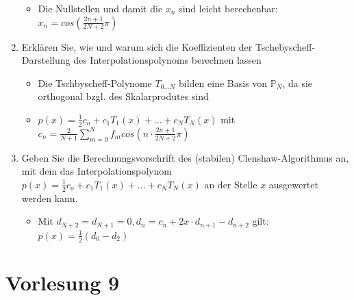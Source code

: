 \documentclass[]{article}
\newcommand*{\poly}{\ensuremath{\mathbb{P}}}
\begin{document}
\begin{enumerate}
\begin{itemize}
				\item Die Nullstellen und damit die $x_n$ sind leicht berechenbar: $x_n = cos(\frac{2n+1}{2N+2} \pi)$
			\end{itemize}
		\item Erklären Sie, wie und warum sich die Koeffizienten der Tschebyscheff-Darstellung des Interpolationspolynoms berechnen lassen
			\begin{itemize}
				\item Die Tschbyscheff-Polynome $T_{0\dots N}$ bilden eine Basis von $\poly_N$, da sie orthogonal bzgl. des Skalarprodutes sind
				\item $p(x) = \frac{1}{2}c_o + c_1T_1(x) + \dots + c_NT_N(x)$ mit \\
					$c_n = \frac{2}{N+1} \sum_{m=0}^{N} f_m cos(n \cdot \frac{2n+1}{2N+2} \pi)$
			\end{itemize}
		\item Geben Sie die Berechnungsvorschrift des (stabilen) Clenshaw-Algorithmus an, mit dem das Interpolationspolynom $p(x) = \frac{1}{2}c_o + c_1T_1(x) + \dots + c_NT_N(x)$ an der Stelle $x$ ausgewertet werden kann.
			\begin{itemize}
				\item Mit $d_{N+2} = d_{N+1} = 0, d_n = c_n + 2x \cdot d_{n+1} - d_{n+2}$ gilt: \\
				$p(x) = \frac{1}{2}(d_0 - d_2)$
			\end{itemize}		
	\end{enumerate}

\section{Vorlesung 9}
\end{document}
